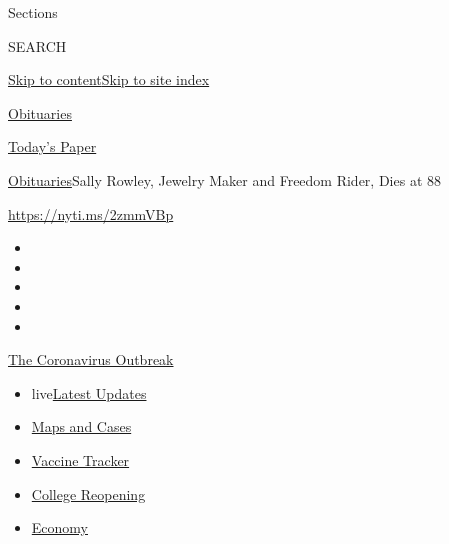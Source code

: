 Sections

SEARCH

\protect\hyperlink{site-content}{Skip to
content}\protect\hyperlink{site-index}{Skip to site index}

\href{https://www.nytimes.com/section/obituaries}{Obituaries}

\href{https://myaccount.nytimes.com/auth/login?response_type=cookie\&client_id=vi}{}

\href{https://www.nytimes.com/section/todayspaper}{Today's Paper}

\href{/section/obituaries}{Obituaries}\textbar{}Sally Rowley, Jewelry
Maker and Freedom Rider, Dies at 88

\url{https://nyti.ms/2zmmVBp}

\begin{itemize}
\item
\item
\item
\item
\item
\end{itemize}

\href{https://www.nytimes.com/news-event/coronavirus?action=click\&pgtype=Article\&state=default\&region=TOP_BANNER\&context=storylines_menu}{The
Coronavirus Outbreak}

\begin{itemize}
\tightlist
\item
  live\href{https://www.nytimes.com/2020/08/03/world/coronavirus-covid-19.html?action=click\&pgtype=Article\&state=default\&region=TOP_BANNER\&context=storylines_menu}{Latest
  Updates}
\item
  \href{https://www.nytimes.com/interactive/2020/us/coronavirus-us-cases.html?action=click\&pgtype=Article\&state=default\&region=TOP_BANNER\&context=storylines_menu}{Maps
  and Cases}
\item
  \href{https://www.nytimes.com/interactive/2020/science/coronavirus-vaccine-tracker.html?action=click\&pgtype=Article\&state=default\&region=TOP_BANNER\&context=storylines_menu}{Vaccine
  Tracker}
\item
  \href{https://www.nytimes.com/2020/08/02/us/covid-college-reopening.html?action=click\&pgtype=Article\&state=default\&region=TOP_BANNER\&context=storylines_menu}{College
  Reopening}
\item
  \href{https://www.nytimes.com/live/2020/08/03/business/stock-market-today-coronavirus?action=click\&pgtype=Article\&state=default\&region=TOP_BANNER\&context=storylines_menu}{Economy}
\end{itemize}

